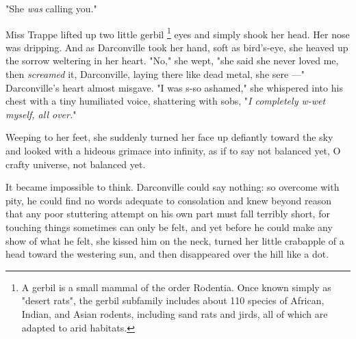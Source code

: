   "She \textit{was} calling you."

  Miss Trappe lifted up two little gerbil 
\footnote{A gerbil is a small mammal of the order Rodentia. Once known simply
as "desert rats", the gerbil subfamily includes about 110 species of African,
Indian, and Asian rodents, including sand rats and jirds, all of which are
adapted to arid habitats. 
}
eyes and simply shook her head. Her nose was dripping. 
And as Darconville took her hand, soft as bird's-eye, she heaved 
up the sorrow weltering 
in her heart. "No," she wept, "she said she never
loved me, then \textit{screamed} it, Darconville, laying there like dead metal, 
she sere 
---" Darconville's heart almost misgave. 
"I was s-so ashamed," she whispered into his chest with a tiny humiliated 
voice, shattering with sobs, "\textit{I completely w-wet myself, all over.}"

  Weeping to her feet, she suddenly turned her face up defiantly 
toward the sky and looked with a hideous grimace 
into infinity, as if to say not balanced yet, O crafty universe, not balanced 
yet.

  It became impossible to think. Darconville could say nothing: so overcome with
pity, he could find no words adequate to consolation and knew beyond reason that
any poor stuttering attempt on his own part must fall terribly short, for
touching things sometimes can only be felt, and yet before he could make any
show of what he felt, she kissed him on the neck, turned her little crabapple of
a head toward the westering 
sun, and then disappeared over the hill like a dot.
 

